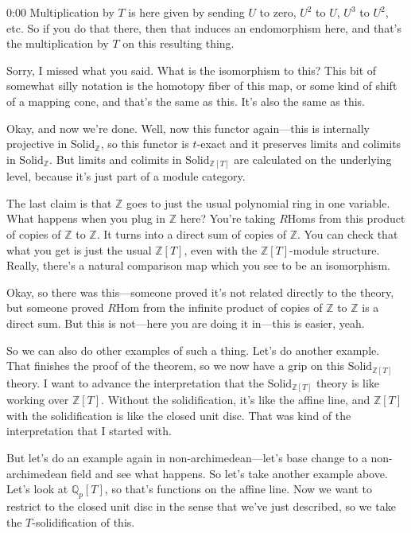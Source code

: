\begin{unfinished}{0:00}
Multiplication by $T$ is here given by sending $U$ to zero, $U^2$ to $U$, $U^3$ to $U^2$, etc. So if you do that there, then that induces an endomorphism here, and that's the multiplication by $T$ on this resulting thing.

Sorry, I missed what you said. What is the isomorphism to this? This bit of somewhat silly notation is the homotopy fiber of this map, or some kind of shift of a mapping cone, and that's the same as this. It's also the same as this.

Okay, and now we're done. Well, now this functor again---this is internally projective in $\mathrm{Solid}_\mathbb{Z}$, so this functor is $t$-exact and it preserves limits and colimits in $\mathrm{Solid}_\mathbb{Z}$. But limits and colimits in $\mathrm{Solid}_{\mathbb{Z}[T]}$ are calculated on the underlying level, because it's just part of a module category.

The last claim is that $\mathbb{Z}$ goes to just the usual polynomial ring in one variable. What happens when you plug in $\mathbb{Z}$ here? You're taking $R\mathrm{Hom}$s from this product of copies of $\mathbb{Z}$ to $\mathbb{Z}$. It turns into a direct sum of copies of $\mathbb{Z}$. You can check that what you get is just the usual $\mathbb{Z}[T]$, even with the $\mathbb{Z}[T]$-module structure. Really, there's a natural comparison map which you see to be an isomorphism.

Okay, so there was this---someone proved it's not related directly to the theory, but someone proved $R\mathrm{Hom}$ from the infinite product of copies of $\mathbb{Z}$ to $\mathbb{Z}$ is a direct sum. But this is not---here you are doing it in---this is easier, yeah.

So we can also do other examples of such a thing. Let's do another example. That finishes the proof of the theorem, so we now have a grip on this $\mathrm{Solid}_{\mathbb{Z}[T]}$ theory. I want to advance the interpretation that the $\mathrm{Solid}_{\mathbb{Z}[T]}$ theory is like working over $\mathbb{Z}[T]$. Without the solidification, it's like the affine line, and $\mathbb{Z}[T]$ with the solidification is like the closed unit disc. That was kind of the interpretation that I started with.

But let's do an example again in non-archimedean---let's base change to a non-archimedean field and see what happens. So let's take another example above. Let's look at $\mathbb{Q}_p[T]$, so that's functions on the affine line. Now we want to restrict to the closed unit disc in the sense that we've just described, so we take the $T$-solidification of this.


\end{unfinished}
